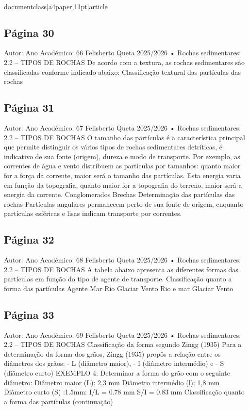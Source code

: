 \\documentclass[a4paper,11pt]{article}
\begin{document}
\subsection*{Página 30}
Autor:
Ano Académico:
66
Felisberto Queta
2025/2026
•
Rochas sedimentares: 
2.2 – TIPOS DE ROCHAS
De acordo com a textura, as rochas sedimentares são classificadas conforme indicado abaixo:
Classificação textural das partículas das rochas  



\subsection*{Página 31}
Autor:
Ano Académico:
67
Felisberto Queta
2025/2026
•
Rochas sedimentares: 
2.2 – TIPOS DE ROCHAS
O tamanho das partículas é a característica principal que permite distinguir os vários tipos de rochas
sedimentares detríticas, é indicativo de sua fonte (origem), dureza e modo de transporte. Por
exemplo, as correntes de água e vento distribuem as partículas por tamanhos: quanto maior for a
força da corrente, maior será o tamanho das partículas. Esta energia varia em função da topografia,
quanto maior for a topografia do terreno, maior será a energia da corrente.
Conglomerados
Brechas
Determinação das partículas das rochas  
Partículas angulares permanecem perto de sua fonte de origem, enquanto partículas esféricas e lisas 
indicam transporte por correntes. 



\subsection*{Página 32}
Autor:
Ano Académico:
68
Felisberto Queta
2025/2026
•
Rochas sedimentares: 
2.2 – TIPOS DE ROCHAS
A tabela abaixo apresenta as diferentes formas das partículas em função do tipo de agente de
transporte.
Classificação quanto a forma das partículas   
Agente
Mar
Rio
Glaciar
Vento
Rio e mar
Glaciar
Vento



\subsection*{Página 33}
Autor:
Ano Académico:
69
Felisberto Queta
2025/2026
•
Rochas sedimentares: 
2.2 – TIPOS DE ROCHAS
Classificação da forma segundo Zingg (1935)
Para a determinação da forma dos grãos, 
Zingg (1935) propôs a relação entre os 
diâmetros dos grãos: 
- L (diâmetro maior), 
- I (diâmetro intermédio) e 
- S (diâmetro curto)
EXEMPLO 4:
Determinar a forma do grão 
com o seguinte diâmetro:
Diâmetro maior (L): 2,3 mm
Diâmetro intermédio (l): 1,8 mm 
Diâmetro curto (S) :1.5mm:
I/L = 0.78 mm
S/I = 0.83 mm
Classificação quanto a forma das partículas (continuação)   
\end{document}
